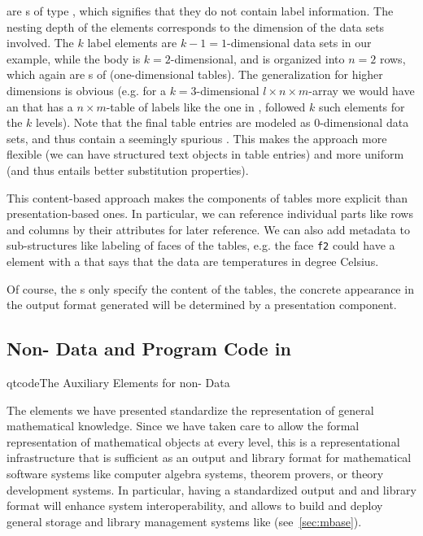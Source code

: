 are {s} of type {}, which signifies that
they do not contain label information.  The nesting depth of the {}
elements corresponds to the dimension of the data sets involved. The $k$ label elements
are $k-1=1$-dimensional data sets in our example, while the body is $k=2$-dimensional, and
is organized into $n=2$ rows, which again are {s} of
{} {} (one-dimensional tables).
The generalization for higher dimensions is obvious (e.g. for a $k=3$-dimensional $l\times
n\times m$-array we would have an {} that has a $n\times m$-table of
labels like the one in {}, followed $k$ such {} elements
for the $k$ levels). Note that the final table entries are modeled as $0$-dimensional data
sets, and thus contain a seemingly spurious {}. This makes the approach
more flexible (we can have structured text objects in table entries) and more uniform (and
thus entails better substitution properties).

This content-based approach makes the components of tables more explicit than
presentation-based ones. In particular, we can reference individual parts like rows and
columns by their {} attributes for later reference. We can also add
metadata to sub-structures like labeling of faces of the tables, e.g. the face {\tt{f2}}
could have a {} element with a {} that says that
the data are temperatures in degree Celsius.

Of course, the {} {s} only specify the
content of the tables, the concrete appearance in the output format generated will be
determined by a presentation component.

\subsection{Non-{\else{\xml}\fi} Data and Program Code in {\else{\omdoc}\fi}}\label{sec:private}

\begin{myfig}{qtcode}{The {\omdoc} Auxiliary Elements for non-{\xml} Data}
  \quicktable{\omlettable{}}
\end{myfig}
The {\omdoc} elements we have presented standardize the representation of general
mathematical knowledge. Since we have taken care to allow the formal representation
of mathematical objects at every level, this is a representational infrastructure
that is sufficient as an output and library format for mathematical software
systems like computer algebra systems, theorem provers, or theory development
systems. In particular, having a standardized output and and library format will
enhance system interoperability, and allows to build and deploy general storage
and library management systems like {\mbase} (see~\ref{sec:mbase}).


